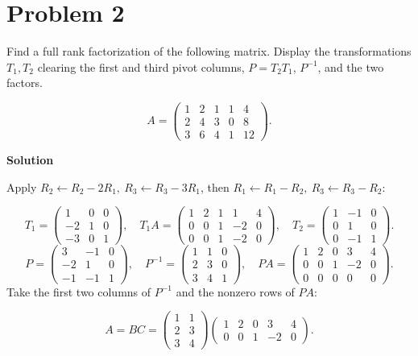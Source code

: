 \documentclass[UTF8,10pt,letterpaper,fontset=fandol]{ctexart}
\begin{document}
\section{Problem 2}
Find a full rank factorization of the following matrix. Display the transformations $T_1,T_2$ clearing the first and third pivot columns, $P=T_2T_1$, $P^{-1}$, and the two factors.\par
\[
 A=\begin{pmatrix}1&2&1&1&4\\2&4&3&0&8\\3&6&4&1&12\end{pmatrix}.
\]
\par{}\textbf{Solution}\par
Apply $R_2\gets R_2-2R_1,\ R_3\gets R_3-3R_1$, then $R_1\gets R_1-R_2,\ R_3\gets R_3-R_2$:\par
\[
T_1=\begin{pmatrix}1&0&0\\-2&1&0\\-3&0&1\end{pmatrix},\quad
T_1A=\begin{pmatrix}1&2&1&1&4\\0&0&1&-2&0\\0&0&1&-2&0\end{pmatrix},\quad
T_2=\begin{pmatrix}1&-1&0\\0&1&0\\0&-1&1\end{pmatrix}.
\]
\[
 P=\begin{pmatrix}3&-1&0\\-2&1&0\\-1&-1&1\end{pmatrix},\quad
 P^{-1}=\begin{pmatrix}1&1&0\\2&3&0\\3&4&1\end{pmatrix},\quad
 PA=\begin{pmatrix}1&2&0&3&4\\0&0&1&-2&0\\0&0&0&0&0\end{pmatrix}.
\]
Take the first two columns of $P^{-1}$ and the nonzero rows of $PA$:\par
\[
 \boxed{A=BC=\begin{pmatrix}1&1\\2&3\\3&4\end{pmatrix}
 \begin{pmatrix}1&2&0&3&4\\0&0&1&-2&0\end{pmatrix}} .
\]
\newpage
\end{document}
